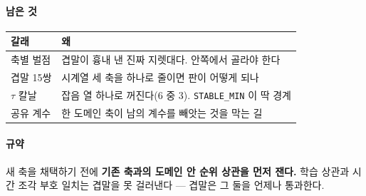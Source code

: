 \documentclass[10pt]{article}
\begin{document}
\paragraph{남은 것}
\begin{center}\small
\begin{tabular}{ll}
\hline
갈래 & 왜 \\
\hline
축별 벌점 & 겹말이 흉내 낸 진짜 지렛대다. 안쪽에서 골라야 한다 \\
겹말 15쌍 & 시계열 세 축을 하나로 줄이면 판이 어떻게 되나 \\
$\tau$ 칼날 & 잡음 열 하나로 꺼진다(6 중 3). \texttt{STABLE\_MIN} 이 딱 경계 \\
공유 계수 & 한 도메인 축이 남의 계수를 빼앗는 것을 막는 길 \\
\hline
\end{tabular}
\end{center}

\paragraph{규약} 새 축을 채택하기 전에 \textbf{기존 축과의 도메인 안 순위
상관을 먼저 잰다.} 학습 상관과 시간 조각 부호 일치는 겹말을 못 걸러낸다 ---
겹말은 그 둘을 언제나 통과한다.
\end{document}
